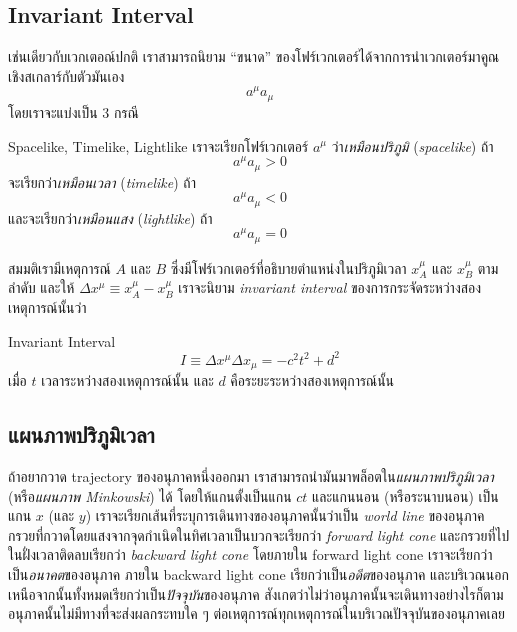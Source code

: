 \subsection{Invariant Interval}

เช่นเดียวกับเวกเตอณ์ปกติ เราสามารถนิยาม ``ขนาด'' ของโฟร์เวกเตอร์ได้จากการนำเวกเตอร์มาคูณเชิงสเกลาร์กับตัวมันเอง
\[
a^\mu a_\mu
\]
โดยเราจะแบ่งเป็น $3$ กรณี
\begin{defbox}{ Spacelike, Timelike, Lightlike}
    เราจะเรียกโฟร์เวกเตอร์ $a^\mu$ ว่า\emph{เหมือนปริภูมิ} (\emph{spacelike}) ถ้า
    \[
    a^\mu a_\mu > 0
    \]
    จะเรียกว่า\emph{เหมือนเวลา} (\emph{timelike}) ถ้า
    \[
    a^\mu a_\mu < 0
    \]
    และจะเรียกว่า\emph{เหมือนแสง} (\emph{lightlike}) ถ้า
    \[
    a^\mu a_\mu = 0
    \]
\end{defbox}

สมมติเรามีเหตุการณ์ $A$ และ $B$ ซึ่งมีโฟร์เวกเตอร์ที่อธิบายตำแหน่งในปริภูมิเวลา $x_A^\mu$ และ $x_B^\mu$ ตามลำดับ และให้ $\Delta x^\mu \equiv x_A^\mu - x_B^\mu$ เราจะนิยาม \emph{invariant interval} ของการกระจัดระหว่างสองเหตุการณ์นั้นว่า
\begin{defbox}{ Invariant Interval}
    \begin{equation}
        I \equiv \Delta x^\mu\Delta x_\mu = -c^2t^2 + d^2
    \end{equation}
    เมื่อ $t$ เวลาระหว่างสองเหตุการณ์นั้น และ $d$ คือระยะระหว่างสองเหตุการณ์นั้น
\end{defbox}

\subsection{แผนภาพปริภูมิเวลา}

ถ้าอยากวาด trajectory ของอนุภาคหนึ่งออกมา เราสามารถนำมันมาพล็อตใน\emph{แผนภาพปริภูมิเวลา} (หรือ\emph{แผนภาพ Minkowski}) ได้ โดยให้แกนตั้งเป็นแกน $ct$ และแกนนอน (หรือระนาบนอน) เป็นแกน $x$ (และ $y$) เราจะเรียกเส้นที่ระบุการเดินทางของอนุภาคนั้นว่าเป็น \emph{world line} ของอนุภาค กรวยที่กวาดโดยแสงจากจุดกำเนิดในทิศเวลาเป็นบวกจะเรียกว่า \emph{forward light cone} และกรวยที่ไปในฝั่งเวลาติดลบเรียกว่า \emph{backward light cone} โดยภายใน forward light cone เราจะเรียกว่าเป็น\emph{อนาคต}ของอนุภาค ภายใน backward light cone เรียกว่าเป็น\emph{อดีต}ของอนุภาค และบริเวณนอกเหนือจากนั้นทั้งหมดเรียกว่าเป็น\emph{ปัจจุบัน}ของอนุภาค สังเกตว่าไม่ว่าอนุภาคนั้นจะเดินทางอย่างไรก็ตาม อนุภาคนั้นไม่มีทางที่จะส่งผลกระทบใค ๆ ต่อเหตุการณ์ทุกเหตุการณ์ในบริเวณปัจจุบันของอนุภาคเลย

